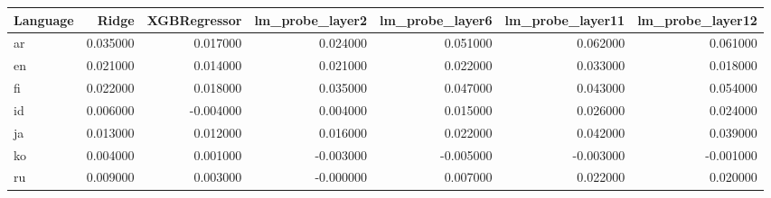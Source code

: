 \begin{tabular}{lrrrrrr}
\toprule
Language & Ridge & XGBRegressor & lm_probe_layer2 & lm_probe_layer6 & lm_probe_layer11 & lm_probe_layer12 \\
\midrule
ar & 0.035000 & 0.017000 & 0.024000 & 0.051000 & 0.062000 & 0.061000 \\
en & 0.021000 & 0.014000 & 0.021000 & 0.022000 & 0.033000 & 0.018000 \\
fi & 0.022000 & 0.018000 & 0.035000 & 0.047000 & 0.043000 & 0.054000 \\
id & 0.006000 & -0.004000 & 0.004000 & 0.015000 & 0.026000 & 0.024000 \\
ja & 0.013000 & 0.012000 & 0.016000 & 0.022000 & 0.042000 & 0.039000 \\
ko & 0.004000 & 0.001000 & -0.003000 & -0.005000 & -0.003000 & -0.001000 \\
ru & 0.009000 & 0.003000 & -0.000000 & 0.007000 & 0.022000 & 0.020000 \\
\bottomrule
\end{tabular}
